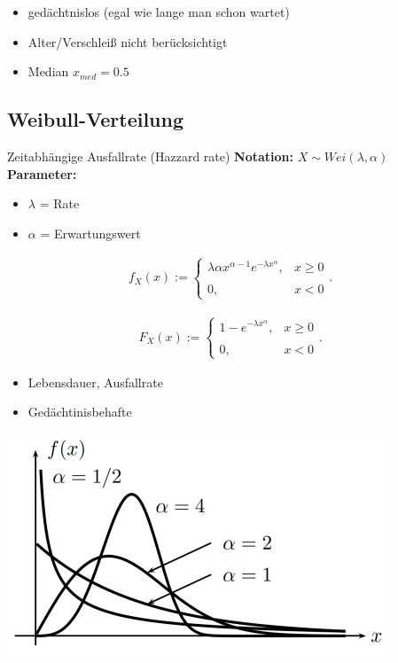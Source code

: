 \documentclass[10pt,a4paper]{article}
\begin{document}
  \begin{itemize}
      \item gedächtnislos (egal wie lange man schon wartet)
      \item Alter/Verschleiß nicht berücksichtigt
      \item Median $x_{med} = 0.5$
  \end{itemize}

\subsection{Weibull-Verteilung}
Zeitabhängige Ausfallrate (Hazzard rate)
\textbf{Notation:} $X \sim Wei(\lambda, \alpha)$ \\
\textbf{Parameter:} \begin{itemize}
    \item $\lambda$ = Rate
    \item $\alpha$ = Erwartungswert
\end{itemize}
  \begin{mdframed}[style=exercise]
    \begin{align}
        f_X(x):=\left\{\begin{array}{ll} \lambda \alpha x^{\alpha -1}e^{-\lambda x^{\alpha}}, & x \geq 0 \\ \\
        0, & x < 0 \end{array}\right. .
    \end{align}
  \end{mdframed}

  \begin{mdframed}[style=exercise]
    \begin{align}
        F_X(x):=\left\{\begin{array}{ll} 1-e^{-\lambda x^{\alpha}}, & x \geq 0 \\ \\
        0, & x < 0 \end{array}\right. .
    \end{align}
  \end{mdframed}
  \begin{itemize}
      \item Lebensdauer, Ausfallrate
      \item Gedächtinisbehafte
  \end{itemize}

  \begin{center}
      \includegraphics[width=.5\textwidth]{./img/weibull.png}
  \end{center}
\end{document}

